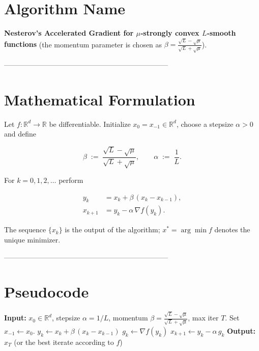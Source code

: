 \documentclass{article}
\newcommand{\grad}{\nabla}
\newcommand{\R}{\mathbb{R}}
\begin{document}
\section*{Algorithm Name}
\textbf{Nesterov’s Accelerated Gradient for $\mu$‑strongly convex $L$‑smooth functions}  
(the momentum parameter is chosen as $\displaystyle \beta =\frac{\sqrt{L}-\sqrt{\mu}}{\sqrt{L}+\sqrt{\mu}}$).

---------------------------------------------------------------------

\section*{Mathematical Formulation}
Let $f:\R^{d}\rightarrow\R$ be differentiable.  
Initialize $x_{0}=x_{-1}\in\R^{d}$, choose a stepsize $\alpha>0$ and define  

\[
\beta \;:=\; \frac{\sqrt{L}-\sqrt{\mu}}{\sqrt{L}+\sqrt{\mu}},\qquad 
\alpha \;:=\; \frac{1}{L}.
\]

For $k=0,1,2,\dots$ perform  

\[
\boxed{
\begin{aligned}
y_{k} & = x_{k}+ \beta\,(x_{k}-x_{k-1}),\\[2mm]
x_{k+1} & = y_{k}-\alpha\,\grad f (y_{k}) .
\end{aligned}}
\tag{1}
\]

The sequence $\{x_{k}\}$ is the output of the algorithm; $x^{\ast}=\arg\min f$ denotes the unique minimizer.

---------------------------------------------------------------------

\section*{Pseudocode}
\begin{algorithm}[H]
\caption{Nesterov Accelerated Gradient (strongly convex case)}
\begin{algorithmic}[1]
\State \textbf{Input:} $x_{0}\in\R^{d}$, stepsize $\alpha=1/L$, momentum $\beta=\frac{\sqrt{L}-\sqrt{\mu}}{\sqrt{L}+\sqrt{\mu}}$, max iter $T$.
\State Set $x_{-1}\gets x_{0}$.
    \State $y_{k}\gets x_{k}+ \beta\,(x_{k}-x_{k-1})$ \hfill{}
    \State $g_{k}\gets \grad f(y_{k})$ \hfill{}
    \State $x_{k+1}\gets y_{k}-\alpha\, g_{k}$ \hfill{}
\EndFor
\State \textbf{Output:} $x_{T}$ (or the best iterate according to $f$)
\end{algorithmic}
\end{algorithm}
\end{document}
